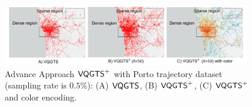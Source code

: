 \begin{figure}[t]
	\centering
	\includegraphics[width=0.95\textwidth]{pictures/problemsolveing/delta_motivation.pdf}
	\caption{Advance Approach $\mathsf{VQGTS}^{+}$ with Porto trajectory dataset (sampling rate is $0.5\%$): (A) $\mathsf{VQGTS}{}$, (B) $\mathsf{VQGTS}^{+}$, (C) $\mathsf{VQGTS}^{+}$ and color encoding.}
	\label{fig:delta}
\end{figure}




